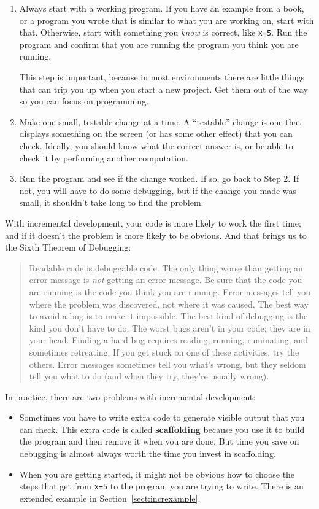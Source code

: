 \documentclass[
]{book}
\numberwithin{Answer}{chapter}
\numberwithin{Exercise}{chapter}
\newcommand{\displaythrm}[1]{%
    \ifthenelse{\equal{#1}{1}}%
        {Readable code is debuggable code.}{%
    \ifthenelse{\equal{#1}{2}}%
        {The only thing worse than getting an error message is {\em
         not} getting an error message.}{%
    \ifthenelse{\equal{#1}{3}}%
        {Be sure that the code you are running
         is the code you think you are running.}{%
    \ifthenelse{\equal{#1}{4}}%
        {Error messages tell you where the problem was discovered,
         not where it was caused.}{%
    \ifthenelse{\equal{#1}{5}}%
        {The best way to avoid a bug is to make it impossible.}{%
    \ifthenelse{\equal{#1}{6}}%
        {The best kind of debugging is the kind you don't have to do.}{%
    \ifthenelse{\equal{#1}{7}}%
        {The worst bugs aren't in your code; they are in your head.}{%
    \ifthenelse{\equal{#1}{8}}%
        {Finding a hard bug requires reading, running, ruminating,
         and sometimes retreating.  If you get stuck on one of these
         activities, try the others.}{%
    \ifthenelse{\equal{#1}{9}}%
        {Error messages sometimes tell you what's wrong, but they
         seldom tell you what to do (and when they try, they're usually
         wrong).}{%
    {}%
}}}}}}}}}}%
\begin{document}
\begin{enumerate}

\item Always start with a working program.  If you have an
example from a book, or a program you wrote that is similar to
what you are working on, start with that.  Otherwise, start with
something you {\em know} is correct, like {\tt x=5}.  Run the program
and confirm that you are running the program you think you are
running.

This step is important, because in most environments there
are little things that can trip you up when you start a new
project.  Get them out of the way so you can focus on programming.

\item Make one small, testable change at a time.  A ``testable''
change is one that displays something on the screen (or has some
other effect) that you can check.  Ideally, you should know what
the correct answer is, or be able to check it by performing another
computation.

\item Run the program and see if the change worked.  If so, go back
to Step 2.  If not, you will have to do some debugging, but if the
change you made was small, it shouldn't take long to find the problem.

\end{enumerate}


With incremental development, your code is more likely to work the first time; and if it doesn't the problem is more likely to be obvious.  And that brings us to the Sixth Theorem of Debugging:

\begin{quote}
\displaythrm{6}
\end{quote}

In practice, there are two problems with incremental development:

\begin{itemize}

\item Sometimes you have to write extra code to
generate visible output that you can check.  This extra code is
called {\bf scaffolding} because you use it to build the program
and then remove it when you are done.  But time you save on
debugging is almost always worth the time you invest in
scaffolding.

\item When you are getting started, it might not be obvious how to
choose the steps that get from {\tt x=5} to the program you are trying
to write.  There is an extended example in Section~\ref{sect:increxample}.

\end{itemize}
\end{document}

